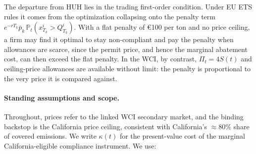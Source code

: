 \documentclass[11pt,letterpaper]{article}
\theoremstyle{plain}
\theoremstyle{definition}
\newcommand{\Prob}{\mathbb{P}}               %
\numberwithin{equation}{section}
\begin{document}
The departure from HUH lies in the trading first-order condition. Under EU ETS rules it comes from the optimization collapsing onto the penalty term $e^{-rT_k}\bar p_k\,\Prob_t(x^i_{T_k}>Q^i_{T_k})$. With a flat penalty of \euro100 per ton and no price ceiling, a firm may find it optimal to stay non-compliant and pay the penalty when allowances are scarce, since the permit price, and hence the marginal abatement cost, can then exceed the flat penalty. In the WCI, by contrast, $\Pi_t=4S(t)$ and ceiling-price allowances are available without limit: the penalty is proportional to the very price it is compared against.

\paragraph{Standing assumptions and scope.}
Throughout, prices refer to the linked WCI secondary market, and the binding backstop is the California price ceiling, consistent with California's $\approx80\%$ share of covered emissions. We write $\kappa(t)$ for the present-value cost of the marginal California-eligible compliance instrument. We use:
\end{document}

